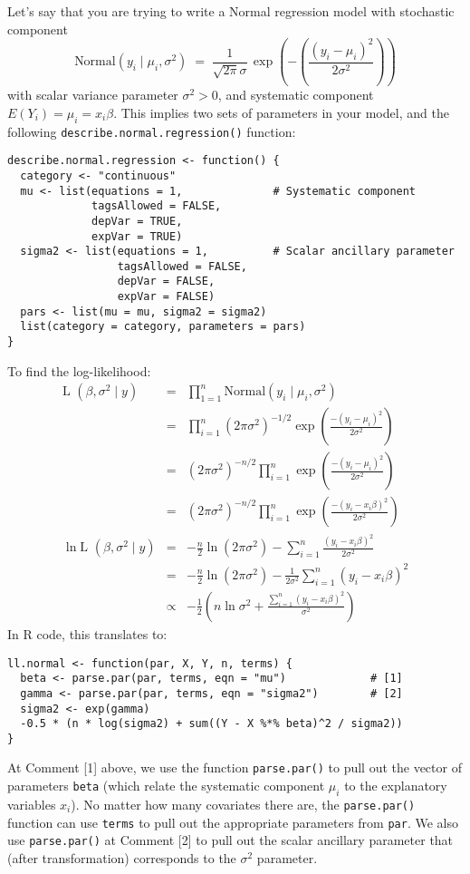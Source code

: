 Let's say that you are trying to write a Normal regression model with
stochastic component
\begin{displaymath}
\textrm{Normal}(y_i \mid \mu_i, \sigma^2) \; = \; \frac{1}{\sqrt{2 \pi} \sigma} \, \exp
\left( -\left( \frac{(y_i - \mu_i)^2}{2 \sigma^2} \right) \right)
\end{displaymath}
with scalar variance parameter $\sigma^2 > 0$, and systematic component
$E(Y_i) = \mu_i = x_i \beta$.  This implies two sets of parameters in your
model, and the following {\tt describe.normal.regression()} function:
\begin{verbatim}
describe.normal.regression <- function() {
  category <- "continuous"
  mu <- list(equations = 1,              # Systematic component
             tagsAllowed = FALSE,
             depVar = TRUE,
             expVar = TRUE)
  sigma2 <- list(equations = 1,          # Scalar ancillary parameter
                 tagsAllowed = FALSE,
                 depVar = FALSE,
                 expVar = FALSE)
  pars <- list(mu = mu, sigma2 = sigma2)
  list(category = category, parameters = pars)
}
\end{verbatim}

To find the log-likelihood:  
\begin{eqnarray*}
\textrm{L }(\beta, \sigma^2 \mid y) & = & \prod_{1=1}^n
       \textrm{Normal}(y_i \mid \mu_i, \sigma^2)\\
    & = & \prod_{i=1}^n (2\pi\sigma^2)^{-1/2}\exp\left(\frac{-(y_i-\mu_i)^2}
{2\sigma^2}\right)\\
    & = &(2\pi\sigma^2)^{-n/2} \prod_{i=1}^n \exp\left(\frac{-(y_i-\mu_i)^2}
{2\sigma^2}\right)\\
    & = &(2\pi\sigma^2)^{-n/2} \prod_{i=1}^n \exp\left(\frac{-(y_i-x_i \beta)^2}
{2\sigma^2}\right)\\
\ln \textrm{L }(\beta, \sigma^2 \mid y) &=& -\frac{n}{2}\ln(2\pi\sigma^2)-
\sum_{i=1}^n \frac{(y_i-x_i\beta)^2}{2\sigma^2}\\
       &=& -\frac{n}{2}\ln(2\pi\sigma^2)-
        \frac{1}{2\sigma^2}\sum_{i=1}^n (y_i-x_i\beta)^2 \\
&\propto& -\frac{1}{2} \left( n \ln\sigma^2 + \frac{\sum_{i=1}^n
(y_i-x_i\beta)^2}{\sigma^2} \right)
\end{eqnarray*}
In R code, this translates to:  
\begin{verbatim}
ll.normal <- function(par, X, Y, n, terms) {
  beta <- parse.par(par, terms, eqn = "mu")             # [1]
  gamma <- parse.par(par, terms, eqn = "sigma2")        # [2]
  sigma2 <- exp(gamma)
  -0.5 * (n * log(sigma2) + sum((Y - X %*% beta)^2 / sigma2))
}
\end{verbatim}
At Comment [1] above, we use the function {\tt parse.par()}
to pull out the vector of parameters {\tt beta} (which relate the
systematic component $\mu_i$ to the explanatory variables $x_i$).  No
matter how many covariates there are, the {\tt parse.par()} function
can use {\tt terms} to pull out the appropriate parameters from {\tt par}.
We also use {\tt parse.par()} at Comment [2] to pull out the scalar
ancillary parameter that (after transformation) corresponds to the
$\sigma^2$ parameter. 

